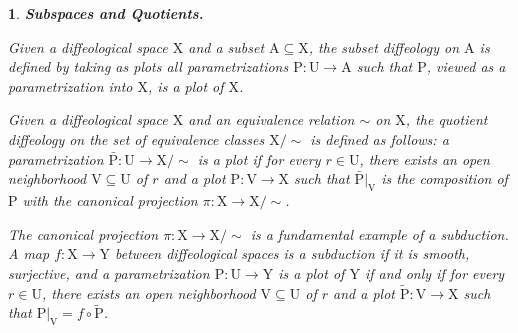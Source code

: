 \documentclass[10pt,reqno,letterpaper,twoside]{amsart}
\theoremstyle{article}
\newtheorem{article}{}
\def\artlabel[#1]{\textbf{#1.}}
\def \A{\mathrm A}
\def \P{\mathrm P}
\def \U{\mathrm U}
\def \V{\mathrm V}
\def \X{\mathrm X}
\def \Y{\mathrm Y}
\newcommand{\Xsim}{{\X/\!\!\sim}}
\begin{document}
  
  \begin{article}
    \artlabel[Subspaces and Quotients]
    \label{Subspaces_and_Quotients}
    
    Given a diffeological space $\X$ and a subset $\A \subseteq \X$,
    the \emph{subset diffeology} on $\A$ is defined by taking as plots all parametrizations $\P: \U \to \A$ such that $\P$,
    viewed as a parametrization into $\X$,
    is a plot of $\X$.
    
    Given a diffeological space $\X$ and an equivalence relation $\sim$ on $\X$,
    the \emph{quotient diffeology} on the set of equivalence classes $\Xsim$ is defined as follows:
    a parametrization $\bar{\P}: \U \to \Xsim$ is a plot if for every $r \in \U$,
    there exists an open neighborhood $\V \subseteq \U$ of $r$ and a plot $\P: \V \to \X$ such that $\bar{\P}|_\V$ is the composition of $\P$ with the canonical projection $\pi: \X \to \Xsim$.
    
    The canonical projection $\pi: \X \to \Xsim$ is a fundamental example of a \emph{subduction}.
    A map $f: \X \to \Y$ between diffeological spaces is a subduction if it is smooth, surjective,
    and a parametrization $\P: \U \to \Y$ is a plot of $\Y$ if and only if for every $r \in \U$, 	there exists an open neighborhood $\V \subseteq \U$ of $r$ and a plot $\tilde{\P}: \V \to \X$ such that $\P|_\V = f \circ \tilde{\P}$.
    
  \end{article}
  
  
\end{document}
